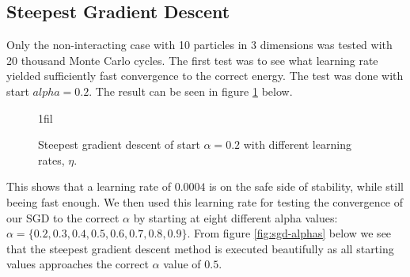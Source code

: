 \documentclass[
]{article}
\makeatletter
\newcommand*{\centerfloat}{%
  \parindent \z@
  \leftskip \z@ \@plus 1fil \@minus \textwidth
  \rightskip\leftskip
  \parfillskip \z@skip}
\makeatother
\begin{document}
\FloatBarrier

\hypertarget{steepest-gradient-descent-1}{%
\subsection{Steepest Gradient
Descent}\label{steepest-gradient-descent-1}}

Only the non-interacting case with 10 particles in 3 dimensions was
tested with 20 thousand Monte Carlo cycles. The first test was to see
what learning rate yielded sufficiently fast convergence to the correct
energy. The test was done with start \(alpha = 0.2\). The result can be
seen in figure \ref{fig:sgd-learning-rates} below.

\begin{figure}[ht]%
  \centerfloat
  \captionsetup[subfigure]{labelformat=empty}
  \caption{Steepest gradient descent of start $\alpha = 0.2$ with different learning rates, $\eta$.}
  \label{fig:sgd-learning-rates}
\end{figure}
\FloatBarrier

This shows that a learning rate of \(0.0004\) is on the safe side of
stability, while still beeing fast enough. We then used this learning
rate for testing the convergence of our SGD to the correct \(\alpha\) by
starting at eight different alpha values:
\(\alpha = \{0.2, 0.3, 0.4, 0.5, 0.6, 0.7, 0.8, 0.9\}\). From figure
\ref{fig:sgd-alphas} below we see that the steepest gradient descent
method is executed beautifully as all starting values approaches the
correct \(\alpha\) value of \(0.5\).
\end{document}
